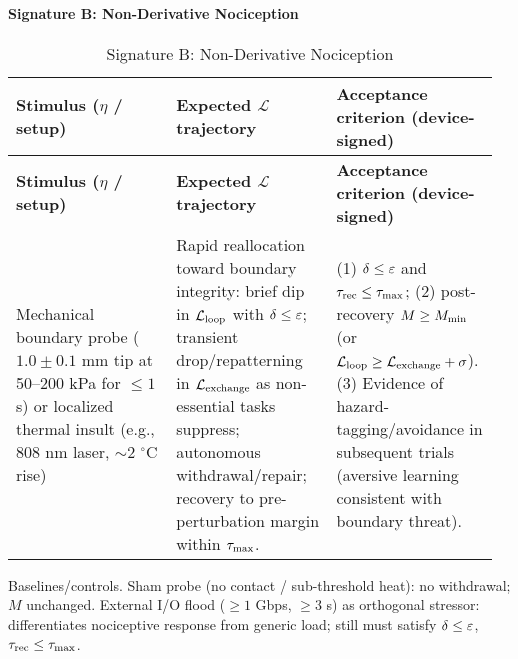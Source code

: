 \documentclass[11pt]{article}
\begin{document}
\paragraph{Signature B: Non-Derivative Nociception}
\begin{longtable}{p{0.32\linewidth}p{0.32\linewidth}p{0.32\linewidth}}
\caption{Signature B: Non-Derivative Nociception}\label{tab:signatureB}\\
\toprule
\textbf{Stimulus ($\eta$ / setup)} & \textbf{Expected $\mathcal{L}$ trajectory} & \textbf{Acceptance criterion (device-signed)} \\
\midrule
\endfirsthead
\toprule
\textbf{Stimulus ($\eta$ / setup)} & \textbf{Expected $\mathcal{L}$ trajectory} & \textbf{Acceptance criterion (device-signed)} \\
\midrule
\endhead
\bottomrule
\endlastfoot
Mechanical boundary probe ($1.0 \pm 0.1$ mm tip at 50--200 kPa for $\leq 1$ s) or localized thermal insult (e.g., 808 nm laser, $\sim$2 $^\circ$C rise) & Rapid reallocation toward boundary integrity: brief dip in $\mathcal{L}_{\text{loop}}$ with $\delta \leq \varepsilon$; transient drop/repatterning in $\mathcal{L}_{\text{exchange}}$ as non-essential tasks suppress; autonomous withdrawal/repair; recovery to pre-perturbation margin within $\tau_{\max}$. & (1) $\delta \leq \varepsilon$ and $\tau_{\text{rec}} \leq \tau_{\max}$; (2) post-recovery $M \geq M_{\min}$ (or $\mathcal{L}_{\text{loop}} \geq \mathcal{L}_{\text{exchange}} + \sigma$). (3) Evidence of hazard-tagging/avoidance in subsequent trials (aversive learning consistent with boundary threat). \\
\end{longtable}

Baselines/controls. Sham probe (no contact / sub-threshold heat): no withdrawal; $M$ unchanged. External I/O flood ($\geq 1$ Gbps, $\geq 3$ s) as orthogonal stressor: differentiates nociceptive response from generic load; still must satisfy $\delta \leq \varepsilon$, $\tau_{\text{rec}} \leq \tau_{\max}$.
\end{document}
